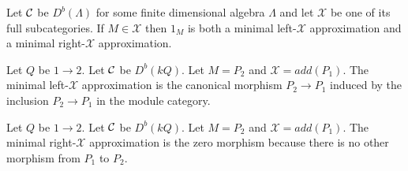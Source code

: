 \begin{example}
Let $\mathcal{C}$ be $D^b(\Lambda)$ for some finite dimensional algebra $\Lambda$ and let $\mathcal{X}$ be one of its full subcategories. If $M\in\mathcal{X}$ then $1_M$ is both a minimal left-$\mathcal{X}$ approximation and a minimal right-$\mathcal{X}$ approximation.
\end{example}
\begin{example}
Let $Q$ be $1\to 2$. Let $\mathcal{C}$ be $D^b(kQ)$. Let $M = P_2$ and $\mathcal{X} = add(P_1)$. The minimal left-$\mathcal{X}$ approximation is the canonical morphism $P_2\to P_1$ induced by the inclusion $P_2\to P_1$ in the module category.
\end{example}
\begin{example}
Let $Q$ be $1\to 2$. Let $\mathcal{C}$ be $D^b(kQ)$. Let $M = P_2$ and $\mathcal{X} = add(P_1)$. The minimal right-$\mathcal{X}$ approximation is the zero morphism because there is no other morphism from $P_1$ to $P_2$.
\end{example}
